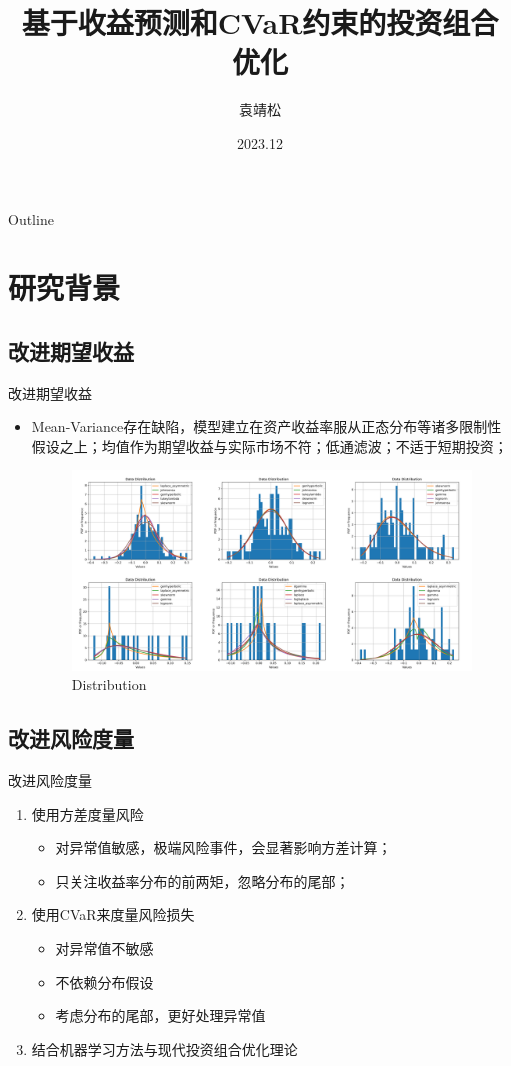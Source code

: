 \documentclass[CJK,aspectratio=43]{beamer}  %
\title[投资组合优化]{基于收益预测和CVaR约束的投资组合优化}
\author{袁靖松}
\institute{金融数学专题展示}
\date{2023.12}
\begin{document}
	\begin{frame}
		\titlepage
	\end{frame}
	\begin{frame}{Outline}
	\end{frame}
\section{研究背景}
\subsection{改进期望收益}
	\begin{frame}{改进期望收益}
			\begin{itemize}
				\item Mean-Variance存在缺陷，模型建立在资产收益率服从正态分布等诸多限制性假设之上；均值作为期望收益与实际市场不符；低通滤波；不适于短期投资；
			\begin{figure}
				\centering
				\includegraphics[width=1.04\linewidth]{"pic/distribution of random six"}
				\caption{Distribution}
				\label{fig:distribution-of-random-stock}
			\end{figure}
			\end{itemize}
	\end{frame}
\subsection{改进风险度量}
	\begin{frame}{改进风险度量}
		\begin{enumerate}
			\item 使用方差度量风险
			\begin{itemize}
				\item 对异常值敏感，极端风险事件，会显著影响方差计算；
				\item 只关注收益率分布的前两矩，忽略分布的尾部；
			\end{itemize}
			\item 使用CVaR来度量风险损失
			\begin{itemize}
				\item 对异常值不敏感
				\item 不依赖分布假设
				\item 考虑分布的尾部，更好处理异常值
			\end{itemize}
			\item 结合机器学习方法与现代投资组合优化理论
			\cite{Tong2021}
		\end{enumerate}
	\end{frame}
\end{document}
